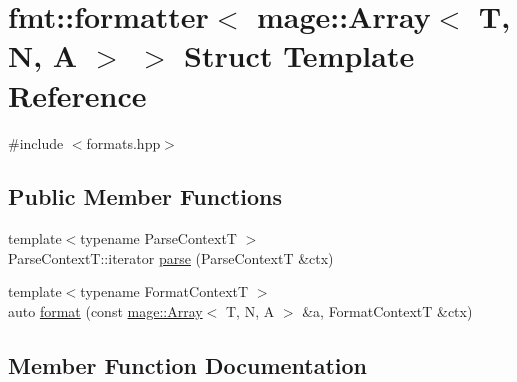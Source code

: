 \hypertarget{structfmt_1_1formatter_3_01mage_1_1_array_3_01_t_00_01_n_00_01_a_01_4_01_4}{}\section{fmt\+:\+:formatter$<$ mage\+:\+:Array$<$ T, N, A $>$ $>$ Struct Template Reference}
\label{structfmt_1_1formatter_3_01mage_1_1_array_3_01_t_00_01_n_00_01_a_01_4_01_4}


{\ttfamily \#include $<$formats.\+hpp$>$}

\subsection*{Public Member Functions}
\begin{DoxyCompactItemize}
\item 
{\footnotesize template$<$typename Parse\+ContextT $>$ }\\Parse\+Context\+T\+::iterator \mbox{\hyperlink{structfmt_1_1formatter_3_01mage_1_1_array_3_01_t_00_01_n_00_01_a_01_4_01_4_a154fdf29b1e99f8ef16e4f02a666e519}{parse}} (Parse\+ContextT \&ctx)
\item 
{\footnotesize template$<$typename Format\+ContextT $>$ }\\auto \mbox{\hyperlink{structfmt_1_1formatter_3_01mage_1_1_array_3_01_t_00_01_n_00_01_a_01_4_01_4_ada7fd2312149bfa8dcab54f57bd1c1fa}{format}} (const \mbox{\hyperlink{structmage_1_1_array}{mage\+::\+Array}}$<$ T, N, A $>$ \&a, Format\+ContextT \&ctx)
\end{DoxyCompactItemize}


\subsection{Member Function Documentation}
\mbox{\label{structfmt_1_1formatter_3_01mage_1_1_array_3_01_t_00_01_n_00_01_a_01_4_01_4_ada7fd2312149bfa8dcab54f57bd1c1fa}} 
